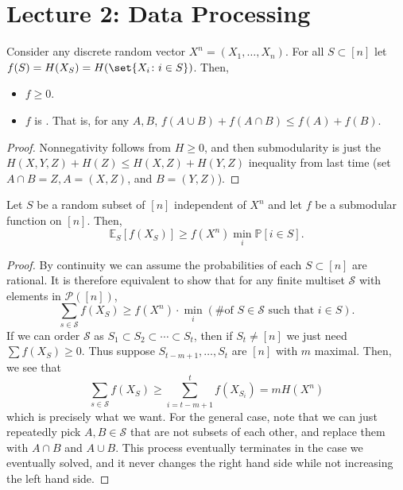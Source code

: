 \section*{Lecture 2: Data Processing}
\setcounter{section}{2}
\setcounter{subsection}{0}
\setcounter{defn}{0}
\setcounter{defncontainer}{0}

\begin{lem}
	Consider any discrete random vector $X^n = (X_1,\ldots, X_n)$. For all $S\subset [n]$ let $f(S) = H(X_S) = H(\set{X_i\colon i\in S})$.
	Then, 
	\begin{itemize}
		\item $f\geq 0$.
		\item $f$ is . That is, for any $A, B$, $f(A\cup B) + f(A\cap B) \leq f(A) + f(B)$.
	\end{itemize}
\end{lem}

\begin{proof}
	Nonnegativity follows from $H \geq 0$, and then submodularity is just the $H(X,Y,Z) + H(Z) \leq H(X,Z) + H(Y,Z)$ inequality from last time (set $A\cap B = Z, A = (X,Z)$, and $B = (Y,Z)$).
\end{proof}

\begin{thm}
	Let $S$ be a random subset of $[n]$ independent of $X^n$ and let $f$ be a submodular function on $[n]$. Then, \[
		\mathbb E_S[f(X_S)] \geq f(X^n) \min_i \mathbb P[i\in S].
	\]
\end{thm}

\begin{proof}
	By continuity we can assume the probabilities of each $S\subset [n]$ are rational. It is therefore equivalent to show that for any finite multiset $\mathcal S$ with elements in $\mathcal P([n])$, \[
		\sum_{s\in \mathcal S} f(X_S) \geq f(X^n) \cdot \min_i (\text{\# of $S\in \mathcal S$ such that $i\in S$}).
	\]
	If we can order $\mathcal S$ as $S_1\subset S_2\subset \cdots \subset S_t$, then if $S_t\neq [n]$ we just need $\sum f(X_S) \geq 0$.
	Thus suppose $S_{t-m+1}, \ldots, S_t$ are $[n]$ with $m$ maximal. Then, we see that \[
		\sum_{s\in \mathcal S} f(X_S) \geq \sum_{i=t-m+1}^{t} f(X_{S_i}) = mH(X^n)
	\]which is precisely what we want.
	For the general case, note that we can just repeatedly pick $A,B\in \mathcal S$ that are not subsets of each other, and replace them with $A\cap B$ and $A\cup B$. This process eventually terminates in the case we eventually solved, and it never changes the right hand side while not increasing the left hand side. 
\end{proof}

